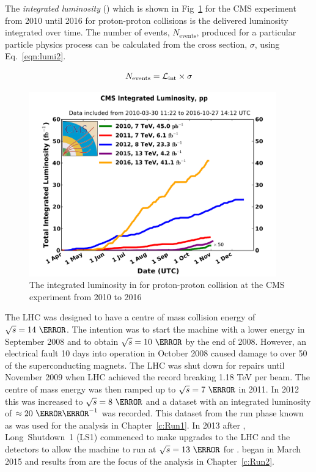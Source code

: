 The \emph{integrated luminosity} (\lumiint) which is shown in Fig~\ref{fig:Lumi} for the CMS experiment from 2010 until 2016 for proton-proton collisions is the delivered luminosity integrated over time. The number of events, $N_{\textrm{events}}$, produced for a particular particle physics process can be calculated from the cross section, $\sigma$, using Eq.~\ref{eqn:lumi2}.

\begin{equation}
N_{\textrm{events}} = \mathcal{L}_{\text{int}} \times \sigma
\label{eqn:lumi2}
\end{equation}

\begin{figure}[ht!]
\centering
    \includegraphics[width=0.95\textwidth]{images/int_lumi_cumulative_pp_2.pdf}
    \caption{The integrated luminosity in \fbinv for proton-proton collision at the CMS experiment from 2010 to 2016}
    \label{fig:Lumi}
\end{figure}

The LHC was designed to have a centre of mass collision energy of $\sqrt{s} = 14~\TeV$. The intention was to start the machine with a lower energy in September 2008 and to obtain $\sqrt{s} = 10~\TeV$ by the end of 2008. However, an electrical fault 10 days into operation in October 2008 caused damage to over 50 of the superconducting magnets. The LHC was shut down for repairs until November 2009 when LHC achieved the record breaking 1.18 TeV per beam. The centre of mass energy was then ramped up to $\sqrt{s} = 7~\TeV$ in 2011. In 2012 this was increased to $\sqrt{s} = 8~\TeV$ and a dataset with an integrated luminosity of $\approx 20~\fbinv$ was recorded. This dataset from the run phase known as \emph{\runone} was used for the analysis in Chapter~\ref{c:Run1}. In 2013 after \runone, Long~Shutdown~1 (LS1) commenced to make upgrades to the LHC and the detectors to allow the machine to run at $\sqrt{s} = 13~\TeV$ for \emph{\runtwo}. \runtwo began in March 2015 and results from \runtwo are the focus of the analysis in Chapter~\ref{c:Run2}.


